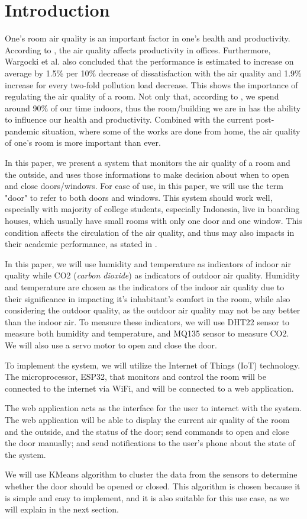 \section{Introduction}
One's room air quality is an important factor in one's health and productivity.
According to \cite{productivity_air_quality_wargocki_2000}, the air quality affects productivity in offices. Furthermore, Wargocki et al. also concluded that the performance is estimated to increase on average by 1.5\% per 10\% decrease of dissatisfaction with the air quality and 1.9\% increase for every two-fold pollution load decrease. This shows the importance of regulating the air quality of a room.
Not only that, according to \cite{indoor_air_quality_stafford_2015}, we spend around 90\% of our time indoors, thus the room/building we are in has the ability to influence our health and productivity.
Combined with the current post-pandemic situation, where some of the works are done from home, the air quality of one's room is more important than ever.

In this paper, we present a system that monitors the air quality of a room and the outside, and uses those informations to make decision about when to open and close doors/windows.
For ease of use, in this paper, we will use the term "door" to refer to both doors and windows.
This system should work well, especially with majority of college students, especially Indonesia, live in boarding houses, which usually have small rooms with only one door and one window. This condition affects the circulation of the air quality, and thus may also impacts in their academic performance, as stated in \cite{indoor_air_quality_stafford_2015}.

In this paper, we will use humidity and temperature as indicators of indoor air quality while CO2 (\textit{carbon dioxide}) as indicators of outdoor air quality.
Humidity and temperature are chosen as the indicators of the indoor air quality due to their significance in impacting it's inhabitant's comfort in the room, while also considering the outdoor quality, as the outdoor air quality may not be any better than the indoor air.
To measure these indicators, we will use DHT22 sensor to measure both humidity and temperature, and MQ135 sensor to measure CO2. We will also use a servo motor to open and close the door.

To implement the system, we will utilize the Internet of Things (IoT) technology.
The microprocessor, ESP32, that monitors and control the room will be connected to the internet via WiFi, and will be connected to a web application.

The web application acts as the interface for the user to interact with the system.
The web application will be able to display the current air quality of the room and the outside, and the status of the door; send commands to open and close the door manually; and send notifications to the user's phone about the state of the system.

We will use KMeans algorithm to cluster the data from the sensors to determine whether the door should be opened or closed. This algorithm is chosen because it is simple and easy to implement, and it is also suitable for this use case, as we will explain in the next section.